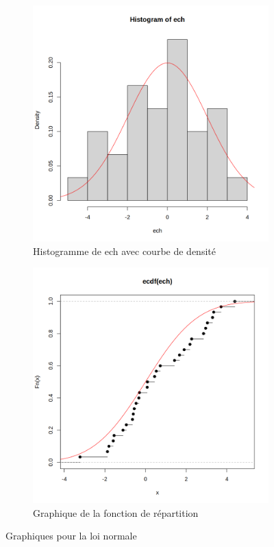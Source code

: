     \begin{figure}[h!]
        \centering
        \begin{subfigure}[b]{0.28\textwidth}
            \includegraphics[width=\textwidth]{4_attachments/figures/output1.png}
            \caption{Histogramme de ech avec courbe de densité}
        \end{subfigure}
        \begin{subfigure}[b]{0.28\textwidth}
            \includegraphics[width=\textwidth]{4_attachments/figures/output2.png}
            \caption{Graphique de la fonction de répartition}
        \end{subfigure}
        \caption{Graphiques pour la loi normale}
        \label{fig:normal_distribution}
    \end{figure}


